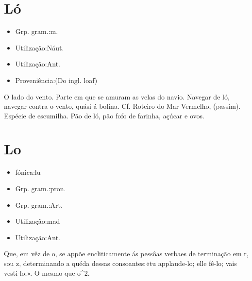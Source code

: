 \section{Ló}
\begin{itemize}
\item {Grp. gram.:m.}
\end{itemize}
\begin{itemize}
\item {Utilização:Náut.}
\end{itemize}
\begin{itemize}
\item {Utilização:Ant.}
\end{itemize}
\begin{itemize}
\item {Proveniência:(Do ingl. \textunderscore loaf\textunderscore )}
\end{itemize}
O lado do vento.
Parte em que se amuram as velas do navio.
\textunderscore Navegar de ló\textunderscore , navegar contra o vento, quási á bolina. Cf. \textunderscore Roteiro do Mar-Vermelho\textunderscore , (passim).
Espécie de escumilha.
\textunderscore Pão de ló\textunderscore , pão fofo de farinha, açúcar e ovos.
\section{Lo}
\begin{itemize}
\item {fónica:lu}
\end{itemize}
\begin{itemize}
\item {Grp. gram.:pron.}
\end{itemize}
\begin{itemize}
\item {Grp. gram.:Art.}
\end{itemize}
\begin{itemize}
\item {Utilização:mad}
\end{itemize}
\begin{itemize}
\item {Utilização:Ant.}
\end{itemize}
Que, em vêz de \textunderscore o\textunderscore , se appõe encliticamente ás pessôas verbaes de terminação em \textunderscore r\textunderscore , \textunderscore s\textunderscore  ou \textunderscore z\textunderscore , determinando a quéda dessas consoantes:«\textunderscore tu applaude-lo; elle fê-lo; vais vesti-lo;\textunderscore ».
O mesmo que \textunderscore o\textunderscore ^2.
